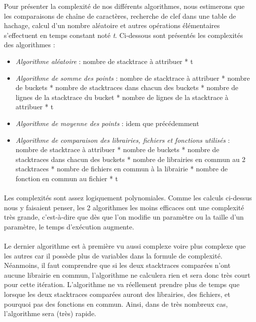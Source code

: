 \documentclass{article}
\begin{document}
Pour présenter la complexité de nos différents algorithmes, nous estimerons que les comparaisons de chaîne de caractères, recherche de clef dans une table de hachage, calcul d'un nombre aléatoire et autres opérations élémentaires s'effectuent en temps constant noté \textit{t}. Ci-dessous sont présentés les complexités des algorithmes :

\begin{itemize}
\item \textit{Algorithme aléatoire} : nombre de stacktrace à attribuer * t
\item \textit{Algorithme de somme des points} : nombre de stacktrace à attribuer * nombre de buckets * nombre de stacktraces dans chacun des buckets * nombre de lignes de la stacktrace du bucket * nombre de lignes de la stacktrace à attribuer * t
\item \textit{Algorithme de moyenne des points} : idem que précédemment
\item \textit{Algorithme de comparaison des librairies, fichiers et fonctions utilisés} : nombre de stacktrace à attribuer * nombre de buckets * nombre de stacktraces dans chacun des buckets * nombre de librairies en commun au 2 stacktraces * nombre de fichiers en commun à la librairie * nombre de fonction en commun au fichier * t
\end{itemize}

\paragraph{}
Les complexités sont assez logiquement polynomiales. Comme les calculs ci-dessus nous y faisaient penser, les 2 algorithmes les moins efficaces ont une complexité très grande, c'est-à-dire que dès que l'on modifie un paramètre ou la taille d'un paramètre, le temps d'exécution augmente. 

\paragraph{}
Le dernier algorithme est à première vu aussi complexe voire plus complexe que les autres car il possède plus de variables dans la formule de complexité. Néanmoins, il faut comprendre que si les deux stacktraces comparées n'ont aucune librairie en commun, l'algorithme ne calculera rien et sera donc très court pour cette itération. L'algorithme ne va réellement prendre plus de temps que lorsque les deux stacktraces comparées auront des librairies, des fichiers, et pourquoi pas des fonctions en commun. Ainsi, dans de très nombreux cas, l'algorithme sera (très) rapide.
\end{document}
